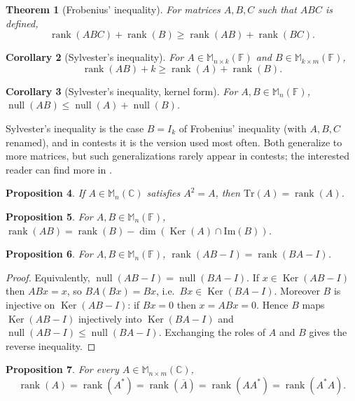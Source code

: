 \documentclass[12pt]{article}
\renewcommand{\Tr}{\mathrm{Tr}}
\DeclareMathOperator{\Rank}{rank}
\DeclareMathOperator{\Null}{null}
\DeclareMathOperator{\Ker}{Ker}
\theoremstyle{breakplain}
\newtheorem{theorem}{Theorem}[section]
\newtheorem{corollary}[theorem]{Corollary}
\newtheorem{prop}[theorem]{Proposition}
\theoremstyle{breakdef}
\theoremstyle{remark}
\begin{document}
\begin{theorem}[Frobenius' inequality]
    For matrices $A,B,C$ such that $ABC$ is defined,
    \[\Rank(ABC)+\Rank(B)\geq \Rank(AB)+\Rank(BC).\]
\end{theorem}
\begin{corollary}[Sylvester's inequality]
    For $A\in\mathbb{M}_{n\times k}(\mathbb{F})$ and $B\in\mathbb{M}_{k\times m}(\mathbb{F})$,
    \[\Rank(AB)+k\geq \Rank(A)+\Rank(B).\]
\end{corollary}
\begin{corollary}[Sylvester's inequality, kernel form]
    For $A,B\in\mathbb{M}_{n}(\mathbb{F})$, $\Null(AB)\leq \Null(A)+\Null(B)$.
\end{corollary}
Sylvester's inequality is the case $B=I_k$ of Frobenius' inequality (with $A,B,C$ renamed), and in contests it is the version used most often. Both generalize to more matrices, but such generalizations rarely appear in contests; the interested reader can find more in \cite{T}.
\begin{prop}
    If $A\in \mathbb{M}_n(\mathbb{C})$ satisfies $A^2=A$, then $\Tr(A)=\Rank(A)$.
\end{prop}
\begin{prop}
    For $A,B\in \mathbb{M}_n(\mathbb{F})$, $\Rank(AB)=\Rank(B)-\dim(\Ker(A)\cap \mathrm{Im}(B))$.
\end{prop}
\begin{prop}
    For $A,B\in\mathbb{M}_{n}(\mathbb{F})$, $\Rank(AB-I)=\Rank(BA-I)$.
\end{prop}
\begin{proof}
    Equivalently, $\Null(AB-I)=\Null(BA-I)$. If $x\in \Ker(AB-I)$ then $ABx=x$, so $BA(Bx)=Bx$, i.e.\ $Bx\in \Ker(BA-I)$. Moreover $B$ is injective on $\Ker(AB-I)$: if $Bx=0$ then $x=ABx=0$. Hence $B$ maps $\Ker(AB-I)$ injectively into $\Ker(BA-I)$ and $\Null(AB-I)\leq \Null(BA-I)$. Exchanging the roles of $A$ and $B$ gives the reverse inequality.
\end{proof}
\begin{prop}
    For every $A\in\mathbb{M}_{n\times m}(\mathbb{C})$,
    \[\Rank(A)=\Rank(A^*)=\Rank(\overline{A})=\Rank(AA^*)=\Rank(A^*A).\]
\end{prop}
\end{document}
